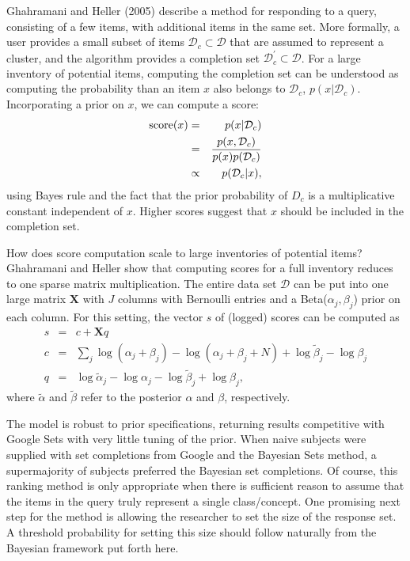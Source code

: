 \documentclass[12pt,letterpaper]{article}
\begin{document}

Ghahramani and Heller (2005) describe a method for responding to a query, consisting of a few items, with additional items in the same set. More formally, a user provides a small subset of items $\mathcal{D}_c \subset \mathcal{D}$ that are assumed to represent a cluster, and the algorithm provides a completion set $\mathcal{D}_c^{\prime} \subset \mathcal{D}$. For a large inventory of potential items, computing the completion set can be understood as computing the probability than an item $x$ also belongs to $\mathcal{D}_c$, $p(x|\mathcal{D}_c)$. Incorporating a prior on $x$, we can compute a score: 
\begin{eqnarray*}
\text{score}(x) &=& p(x|\mathcal{D}_c) \\
&=& p(x, \mathcal{D}_c) \over p(x) p(\mathcal{D}_c) \\
&\propto& p(\mathcal{D}_c|x),
\end{eqnarray*}
using Bayes rule and the fact that the prior probability of $D_c$ is a multiplicative constant independent of $x$. Higher scores suggest that $x$ should be included in the completion set.

How does score computation scale to large inventories of potential items? Ghahramani and Heller show that computing scores for a full inventory reduces to one sparse matrix multiplication. The entire data set $\mathcal{D}$ can be put into one large matrix $\mathbf{X}$ with $J$ columns with Bernoulli entries and a Beta($\alpha_j, \beta_j$) prior on each column. For this setting, the vector $s$ of (logged) scores can be computed as 
\begin{eqnarray*}
s &=& c + \mathbf{X}q \\
c &=& \sum_j \log(\alpha_j + \beta_j) - \log(\alpha_j + \beta_j + N) + \log \tilde{\beta}_j - \log \beta_j \\
q &=& \log \tilde{\alpha}_j - \log \alpha_j - \log \tilde{\beta}_j + \log \beta_j,
\end{eqnarray*}
where $\tilde{\alpha}$ and $\tilde{\beta}$ refer to the posterior $\alpha$ and $\beta$, respectively. 

The model is robust to prior specifications, returning results competitive with Google Sets with very little tuning of the prior. When naive subjects were supplied with set completions from Google and the Bayesian Sets method, a supermajority of subjects preferred the Bayesian set completions. Of course, this ranking method is only appropriate when there is sufficient reason to assume that the items in the query truly represent a single class/concept. One promising next step for the method is allowing the researcher to set the size of the response set. A threshold probability for setting this size should follow naturally from the Bayesian framework put forth here. 
\end{document}
